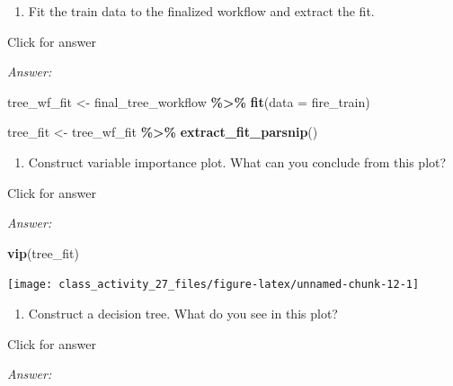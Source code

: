 \documentclass[
]{book}
\newenvironment{Shaded}{\begin{snugshade}}{\end{snugshade}}
\newcommand{\AttributeTok}[1]{\textcolor[rgb]{0.13,0.29,0.53}{#1}}
\newcommand{\FunctionTok}[1]{\textcolor[rgb]{0.13,0.29,0.53}{\textbf{#1}}}
\newcommand{\NormalTok}[1]{#1}
\newcommand{\OtherTok}[1]{\textcolor[rgb]{0.56,0.35,0.01}{#1}}
\newcommand{\SpecialCharTok}[1]{\textcolor[rgb]{0.81,0.36,0.00}{\textbf{#1}}}
\providecommand{\tightlist}{%
  \setlength{\itemsep}{0pt}\setlength{\parskip}{0pt}}
\begin{document}
\begin{enumerate}
\def\labelenumi{\roman{enumi}.}
\tightlist
\item
  Fit the train data to the finalized workflow and extract the fit.
\end{enumerate}

Click for answer

\emph{Answer:}

\begin{Shaded}
\begin{Highlighting}[]
\NormalTok{tree\_wf\_fit }\OtherTok{\textless{}{-}}\NormalTok{ final\_tree\_workflow }\SpecialCharTok{\%\textgreater{}\%} \FunctionTok{fit}\NormalTok{(}\AttributeTok{data =}\NormalTok{ fire\_train)}
\end{Highlighting}
\end{Shaded}

\begin{Shaded}
\begin{Highlighting}[]
\NormalTok{tree\_fit }\OtherTok{\textless{}{-}}\NormalTok{ tree\_wf\_fit }\SpecialCharTok{\%\textgreater{}\%}  \FunctionTok{extract\_fit\_parsnip}\NormalTok{()}
\end{Highlighting}
\end{Shaded}

\begin{enumerate}
\def\labelenumi{\alph{enumi}.}
\setcounter{enumi}{9}
\tightlist
\item
  Construct variable importance plot. What can you conclude from this plot?
\end{enumerate}

Click for answer

\emph{Answer:}

\begin{Shaded}
\begin{Highlighting}[]
\FunctionTok{vip}\NormalTok{(tree\_fit)}
\end{Highlighting}
\end{Shaded}

\texttt{[image: class\_activity\_27\_files/figure-latex/unnamed-chunk-12-1]}

\begin{enumerate}
\def\labelenumi{\alph{enumi}.}
\setcounter{enumi}{10}
\tightlist
\item
  Construct a decision tree. What do you see in this plot?
\end{enumerate}

Click for answer

\emph{Answer:}
\end{document}
